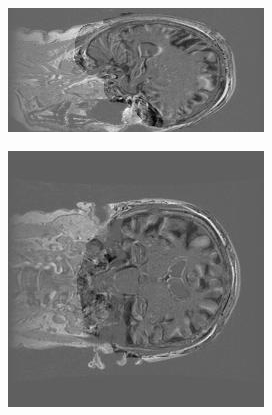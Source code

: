 \documentclass[11pt,a4paper,oneside]{report}
\begin{document}
\begin{figure}[H]
        \centering
        \begin{subfigure}[b]{0.3\textwidth}
                \includegraphics[width=\textwidth, height=0.8\textwidth, angle=90]{figures/diff/t1Nonlin_x.jpg}
        \end{subfigure}%
        \begin{subfigure}[b]{0.3\textwidth}
                \includegraphics[width=\textwidth, angle=90]{figures/diff/t1Nonlin_y.jpg}

\end{subfigure}
\end{figure}
\end{document}
